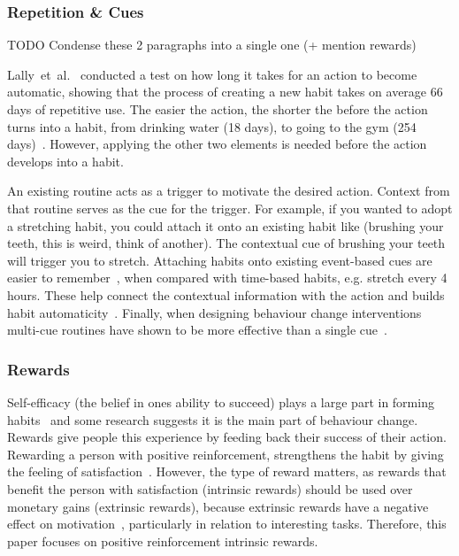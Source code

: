 \documentclass{scaffold/sigchi}
\begin{document}
\subsubsection{Repetition \& Cues}
TODO Condense these 2 paragraphs into a single one (+ mention rewards)


Lally~et~al.~\cite{article_how_habits_formed_modelling_habit_formation} conducted a test on how long it takes for an action to become automatic, showing that the process of creating a new habit takes on average 66 days of repetitive use. The easier the action, the shorter the before the action turns into a habit, from drinking water (18 days), to going to the gym (254 days)~\cite{article_how_habits_formed_modelling_habit_formation}. However, applying the other two elements is needed before the action develops into a habit.


An existing routine acts as a trigger to motivate the desired action. Context from that routine serves as the cue for the trigger. For example, if you wanted to adopt a stretching habit, you could attach it onto an existing habit like (brushing your teeth, this is weird, think of another). The contextual cue of brushing your teeth will trigger you to stretch. Attaching habits onto existing event-based cues are easier to remember~\cite{article_implementation_intentions_multicue}, when compared with time-based habits, e.g. stretch every 4 hours. These help connect the contextual information with the action and builds habit automaticity~\cite{article_implementation_intentions}. Finally, when designing behaviour change interventions multi-cue routines have shown to be more effective than a single cue~\cite{article_understanding_use_contextual_cues_design_impl}.

\subsubsection{Rewards}
Self-efficacy (the belief in ones ability to succeed) plays a large part in forming habits~\cite{article_a_self_efficacy} and some research suggests it is the main part of behaviour change. Rewards give people this experience by feeding back their success of their action. Rewarding a person with positive reinforcement, strengthens the habit by giving the feeling of satisfaction~\cite{article_promoting_habit_formation}. However, the type of reward matters, as rewards that benefit the person with satisfaction (intrinsic rewards) should be used over monetary gains (extrinsic rewards), because extrinsic rewards have a negative effect on motivation~\cite{article_meta_analytic_review_intrinsic_motivation}, particularly in relation to interesting tasks. Therefore, this paper focuses on positive reinforcement intrinsic rewards.
\end{document}
